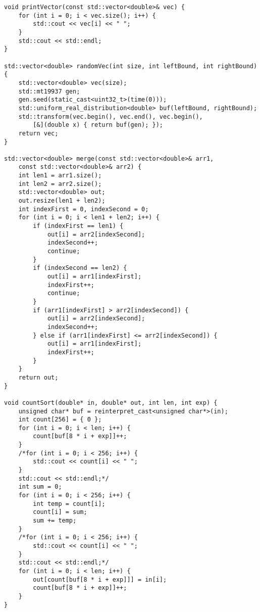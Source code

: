 \documentclass{article}
\begin{document}
\begin{verbatim}
void printVector(const std::vector<double>& vec) {
    for (int i = 0; i < vec.size(); i++) {
        std::cout << vec[i] << " ";
    }
    std::cout << std::endl;
}

std::vector<double> randomVec(int size, int leftBound, int rightBound) {
    std::vector<double> vec(size);
    std::mt19937 gen;
    gen.seed(static_cast<uint32_t>(time(0)));
    std::uniform_real_distribution<double> buf(leftBound, rightBound);
    std::transform(vec.begin(), vec.end(), vec.begin(),
        [&](double x) { return buf(gen); });
    return vec;
}

std::vector<double> merge(const std::vector<double>& arr1,
    const std::vector<double>& arr2) {
    int len1 = arr1.size();
    int len2 = arr2.size();
    std::vector<double> out;
    out.resize(len1 + len2);
    int indexFirst = 0, indexSecond = 0;
    for (int i = 0; i < len1 + len2; i++) {
        if (indexFirst == len1) {
            out[i] = arr2[indexSecond];
            indexSecond++;
            continue;
        }
        if (indexSecond == len2) {
            out[i] = arr1[indexFirst];
            indexFirst++;
            continue;
        }
        if (arr1[indexFirst] > arr2[indexSecond]) {
            out[i] = arr2[indexSecond];
            indexSecond++;
        } else if (arr1[indexFirst] <= arr2[indexSecond]) {
            out[i] = arr1[indexFirst];
            indexFirst++;
        }
    }
    return out;
}

void countSort(double* in, double* out, int len, int exp) {
    unsigned char* buf = reinterpret_cast<unsigned char*>(in);
    int count[256] = { 0 };
    for (int i = 0; i < len; i++) {
        count[buf[8 * i + exp]]++;
    }
    /*for (int i = 0; i < 256; i++) {
        std::cout << count[i] << " ";
    }
    std::cout << std::endl;*/
    int sum = 0;
    for (int i = 0; i < 256; i++) {
        int temp = count[i];
        count[i] = sum;
        sum += temp;
    }
    /*for (int i = 0; i < 256; i++) {
        std::cout << count[i] << " ";
    }
    std::cout << std::endl;*/
    for (int i = 0; i < len; i++) {
        out[count[buf[8 * i + exp]]] = in[i];
        count[buf[8 * i + exp]]++;
    }
}


\end{verbatim}
\end{document}
